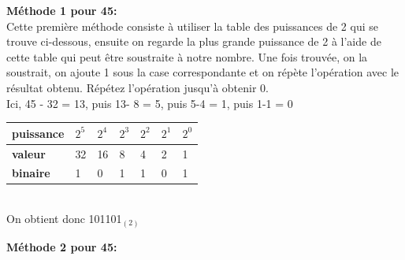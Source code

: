 \begin{Exercice}[5 minutes]
\begin{solution}
    \medskip
    \end{solution}

    \begin{solution}
 \textbf{Méthode 1 pour 45:} \\
        
        Cette première méthode consiste à utiliser la table des puissances de 2 qui se trouve ci-dessous, ensuite on regarde la plus grande puissance de 2 à l'aide de cette table qui peut être soustraite à notre nombre. Une fois trouvée, on la soustrait, on ajoute 1 sous la case correspondante et on répète l'opération avec le résultat obtenu. Répétez l'opération jusqu'à obtenir 0.\\
        
Ici, 45 - 32 = 13, puis 13- 8 = 5, puis 5-4 = 1, puis 1-1 = 0 \\
        
   		\begin{tabular}{| C{0.1\textwidth} | C{0.1\textwidth} | C{0.1\textwidth} | C{0.1\textwidth} | C{0.1\textwidth} | C{0.1\textwidth} | C{0.1\textwidth} |} 
            \hline
            \textbf{puissance} & $2^{5}$ & $2^{4}$ & $2^{3}$ & $2^{2}$ & $2^{1}$ & $2^{0}$ \\ [0.5ex] 
            \hline
            \textbf{valeur} & 32 & 16 & 8 & 4 & 2 & 1 \\ [0.5ex] 
            \hline
            \textbf{binaire} & 1 & 0 & 1 & 1 & 0 & 1 \\ [0.5ex] 
            \hline
        \end{tabular} \\
        
        On obtient donc 101101$_{(2)}$ \\
    \end{solution}

    \begin{solution}
	
	\textbf{Méthode 2 pour 45:} \\
	

\end{solution}
\end{Exercice}
